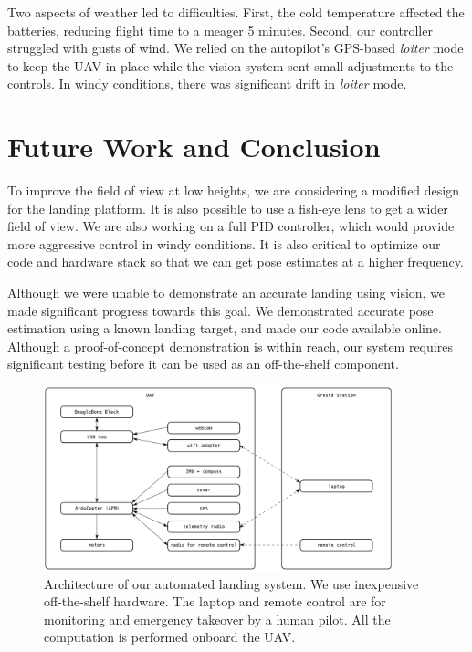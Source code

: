 \documentclass[10pt]{scrartcl} %
\begin{document}
Two aspects of weather led to difficulties. First, the cold temperature
affected the batteries, reducing flight time to a meager 5 minutes.  Second,
our controller struggled with gusts of wind. We relied on the autopilot's
GPS-based \textit{loiter} mode to keep the UAV in place while the vision system
sent small adjustments to the controls. In windy conditions, there was
significant drift in \textit{loiter} mode.


\section{Future Work and Conclusion}

To improve the field of view at low heights, we are considering a modified
design for the landing platform. It is also possible to use a fish-eye lens to
get a wider field of view. We are also working on a full PID controller, which
would provide more aggressive control in windy conditions. It is also critical
to optimize our code and hardware stack so that we can get pose estimates at a
higher frequency.

Although we were unable to demonstrate an accurate landing using vision, we
made significant progress towards this goal. We demonstrated accurate pose
estimation using a known landing target, and made our code available online.
Although a proof-of-concept demonstration is within reach, our system requires
significant testing before it can be used as an off-the-shelf component.


\printbibliography



\clearpage

\begin{figure}[h!]
\centering
\includegraphics[width=0.9\textwidth]{images/architecture.png}
\caption{
    Architecture of our automated landing system. We use inexpensive
    off-the-shelf hardware. The laptop and remote control are for
    monitoring and emergency takeover by a human pilot. All the
    computation is performed onboard the UAV.
}
\label{fig:hardware-arch}
\end{figure}
\end{document}
